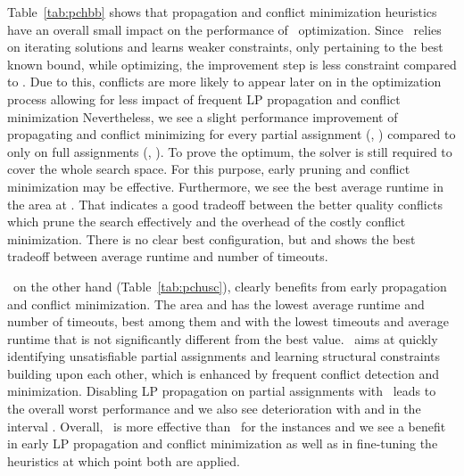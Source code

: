 Table~\ref{tab:pchbb} shows that propagation and conflict minimization heuristics have an overall small impact on the performance of \bb\ optimization.
Since \bb\ relies on iterating solutions and learns weaker constraints,
only pertaining to the best known bound, while optimizing,
the improvement step is less constraint compared to \usc.
Due to this, conflicts are more likely to appear later on in the optimization process allowing for less impact of frequent LP propagation and conflict minimization
Nevertheless, we see a slight performance improvement of propagating and conflict minimizing for every partial assignment (, )
compared to only on full assignments (, ).
To prove the optimum, the solver is still required to cover the whole search space.
For this purpose, early pruning and conflict minimization may be effective.
Furthermore, we see the best average runtime in the area  at .
That indicates a good tradeoff between the better quality conflicts which prune the search effectively
and the overhead of the costly conflict minimization.
There is no clear best configuration,
 but  and  shows the best tradeoff between average runtime and number of timeouts.

\usc\ on the other hand (Table~\ref{tab:pchusc}), clearly benefits from early propagation and conflict minimization.
The area  and  has the lowest average runtime and number of timeouts,
best among them  and 
with the lowest timeouts and average runtime that is not significantly different from the best value.
\usc\ aims at quickly identifying unsatisfiable partial assignments
and learning structural constraints building upon each other,
which is enhanced by frequent conflict detection and minimization.
Disabling LP propagation on partial assignments with \usc\ leads to the overall worst performance
and we also see deterioration with  and  in the interval .
Overall, \usc\ is more effective than \bb\ for the instances and we see a benefit in early LP propagation and conflict minimization as well as in fine-tuning the heuristics at which point both are applied.

